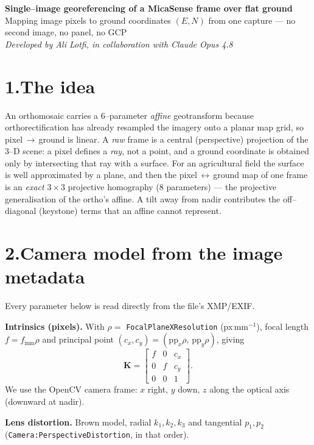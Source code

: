 \documentclass[10pt]{article}
\begin{document}
\begin{center}
{\large\bfseries Single--image georeferencing of a MicaSense frame over flat ground}\\[2pt]
{\small Mapping image pixels to ground coordinates $(E,N)$ from one capture --- no second image, no panel, no GCP}\\[3pt]
{\small\itshape Developed by Ali Lotfi, in collaboration with Claude Opus 4.8}
\end{center}
\vspace{-4pt}

\section*{1.\quad The idea}
An orthomosaic carries a 6--parameter \emph{affine} geotransform because orthorectification has already resampled the imagery onto a planar map grid, so pixel\,$\to$\,ground is linear. A \emph{raw} frame is a central (perspective) projection of the 3--D scene: a pixel defines a \emph{ray}, not a point, and a ground coordinate is obtained only by intersecting that ray with a surface. For an agricultural field the surface is well approximated by a plane, and then the pixel\,$\leftrightarrow$\,ground map of one frame is an \emph{exact} $3\times3$ projective homography (8 parameters) --- the projective generalisation of the ortho's affine. A tilt away from nadir contributes the off--diagonal (keystone) terms that an affine cannot represent.

\section*{2.\quad Camera model from the image metadata}
Every parameter below is read directly from the file's XMP/EXIF.

\noindent\textbf{Intrinsics (pixels).} With $\rho=$ \texttt{FocalPlaneXResolution} (px\,mm$^{-1}$), focal length $f=f_{\mathrm{mm}}\rho$ and principal point $(c_x,c_y)=(\mathrm{pp}_x\rho,\,\mathrm{pp}_y\rho)$, giving
\[
\mathbf{K}=\begin{bmatrix} f & 0 & c_x\\ 0 & f & c_y\\ 0 & 0 & 1 \end{bmatrix}.
\]
We use the OpenCV camera frame: $x$ right, $y$ down, $z$ along the optical axis (downward at nadir).

\noindent\textbf{Lens distortion.} Brown model, radial $k_1,k_2,k_3$ and tangential $p_1,p_2$ (\texttt{Camera:PerspectiveDistortion}, in that order).
\end{document}
